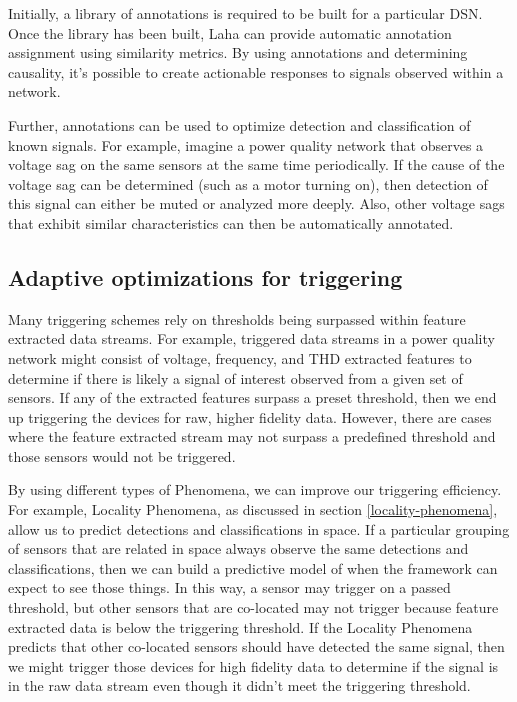 Initially, a library of annotations is required to be built for a particular DSN. Once the library has been built, Laha can provide automatic annotation assignment using similarity metrics. By using annotations and determining causality, it's possible to create actionable responses to signals observed within a network.

Further, annotations can be used to optimize detection and classification of known signals. For example, imagine a power quality network that observes a voltage sag on the same sensors at the same time periodically. If the cause of the voltage sag can be determined (such as a motor turning on), then detection of this signal can either be muted or analyzed more deeply. Also, other voltage sags that exhibit similar characteristics can then be automatically annotated.

\subsection{Adaptive optimizations for triggering}
Many triggering schemes rely on thresholds being surpassed within feature extracted data streams. For example, triggered data streams in a power quality network might consist of voltage, frequency, and THD extracted features to determine if there is likely a signal of interest observed from a given set of sensors. If any of the extracted features surpass a preset threshold, then we  end up triggering the devices for raw, higher fidelity data. However, there are cases where the feature extracted stream may not surpass a predefined threshold and those sensors would not be triggered.

By using different types of Phenomena, we can improve our triggering efficiency. For example, Locality Phenomena, as discussed in section \ref{locality-phenomena}, allow us to predict detections and classifications in space. If a particular grouping of sensors that are related in space always observe the same detections and classifications, then we can build a predictive model of when the framework can expect to see those things. In this way, a sensor may trigger on a passed threshold, but other sensors that are co-located may not trigger because feature extracted data is below the triggering threshold. If the Locality Phenomena predicts that other co-located sensors should have detected the same signal, then we might trigger those devices for high fidelity data to determine if the signal is in the raw data stream even though it didn't meet the triggering threshold.

